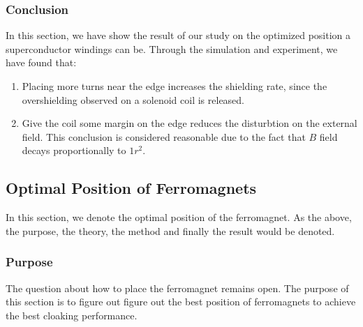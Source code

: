 \subsubsection{Conclusion}
In this section, we have show the result of our study on the optimized position a superconductor windings can be.
Through the simulation and experiment,
we have found that:
\begin{enumerate}
  \item Placing more turns near the edge increases the shielding rate, since the overshielding observed on a solenoid coil is released.
  \item Give the coil some margin on the edge reduces the disturbtion on the external field.
  This conclusion is considered reasonable due to the fact that $B$ field decays proportionally to $1r^2$.
\end{enumerate}


\subsection{Optimal Position of Ferromagnets}
In this section, we denote the optimal position of the ferromagnet.
As the above, the purpose, the theory, the method and finally the result would be denoted.


\subsubsection{Purpose}
The question about how to place the ferromagnet remains open.
The purpose of this section is to figure out figure out the best position of ferromagnets to achieve the best cloaking performance.



